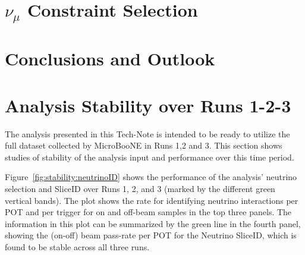 \documentclass[a4paper]{article}
\begin{document}

\newpage





\clearpage


\section{$\nu_{\mu}$ Constraint Selection }
\label{sec:numuselection}

\clearpage

%

\clearpage



\newpage







\newpage

\section{Conclusions and Outlook}



\newpage

\appendix


\section{Analysis Stability over Runs 1-2-3}
\label{sec:timestability}

\par The analysis presented in this Tech-Note is intended to be ready to utilize the full dataset collected by MicroBooNE in Runs 1,2 and 3. This section shows studies of stability of the analysis input and performance over this time period.
\par Figure~\ref{fig:stability:neutrinoID} shows the performance of the analysis' neutrino selection and SliceID over Runs 1, 2, and 3 (marked by the different green vertical bands). The plot shows the rate for identifying neutrino interactions per POT and per trigger for on and off-beam samples in the top three panels. The information in this plot can be summarized by the green line in the fourth panel, showing the (on-off) beam pass-rate per POT for the Neutrino SliceID, which is found to be stable across all three runs.
\end{document}
